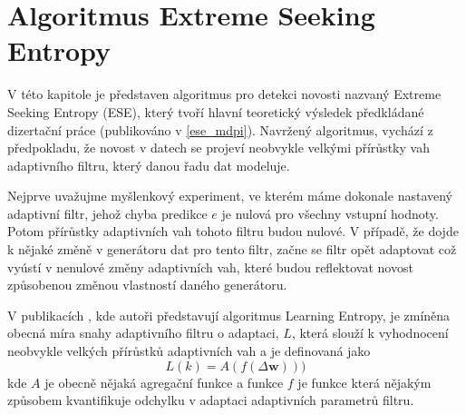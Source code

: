 \chapter{Algoritmus Extreme Seeking Entropy}\label{chap:ese}
V této kapitole je představen algoritmus pro detekci novosti nazvaný Extreme Seeking Entropy (ESE), který tvoří hlavní teoretický výsledek předkládané dizertační práce (publikováno v \ref{ese_mdpi}). Navržený algoritmus, vychází z předpokladu, že novost v datech se projeví neobvykle velkými přírůstky vah adaptivního filtru, který danou řadu dat modeluje.
\par Nejprve uvažujme myšlenkový experiment, ve kterém máme dokonale nastavený adaptivní filtr, jehož chyba predikce $e$ je nulová pro všechny vstupní hodnoty. Potom přírůstky adaptivních vah tohoto filtru budou nulové. V případě, že dojde k nějaké změně v generátoru dat pro tento filtr, začne se filtr opět adaptovat což vyústí v nenulové změny adaptivních vah, které budou reflektovat novost způsobenou změnou vlastností daného generátoru.
\par
V publikacích \cite{ivoLE1,ivoLE2}, kde autoři představují algoritmus Learning Entropy, je zmíněna obecná míra snahy adaptivního filtru o adaptaci, $L$, která slouží k vyhodnocení neobvykle velkých přírůstků adaptivních vah a je definovaná jako
\begin{equation}
L(k)=A(f(\Delta \textbf{w})))
\end{equation}
kde $A$ je obecně nějaká agregační funkce a funkce $f$ je funkce která nějakým způsobem kvantifikuje odchylku v adaptaci adaptivních parametrů filtru.


